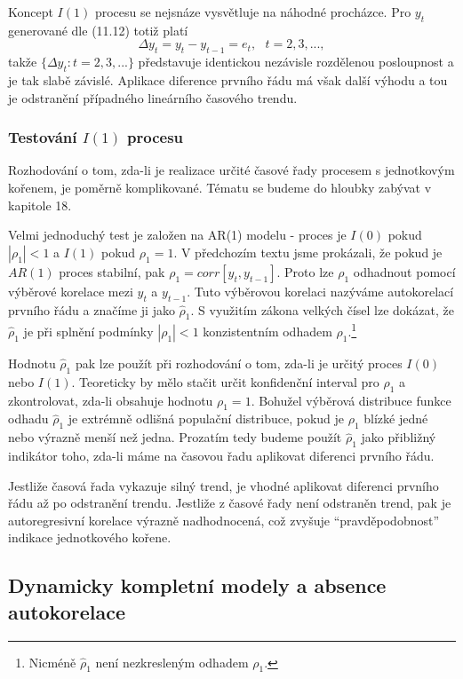 Koncept $I(1)$ procesu se nejsnáze vysvětluje na náhodné procházce. Pro $y_t$ generované dle (11.12) totiž platí
\begin{equation}
\Delta y_t = y_t -  y_{t - 1} = e_t, ~~~ t = 2, 3, ...,
\end{equation}
takže $\{\Delta y_t: t = 2, 3, ...\}$ představuje identickou nezávisle rozdělenou posloupnost a je tak slabě závislé. Aplikace diference prvního řádu má však další výhodu a tou je odstranění případného lineárního časového trendu.

\subsubsection{Testování $I(1)$ procesu}

Rozhodování o tom, zda-li je realizace určité časové řady procesem s jednotkovým kořenem, je poměrně komplikované. Tématu se budeme do hloubky zabývat v kapitole 18.

Velmi jednoduchý test je založen na AR(1) modelu - proces je $I(0)$ pokud $|\rho_1| < 1$ a $I(1)$ pokud $\rho_1 = 1$. V předchozím textu jsme prokázali, že pokud je $AR(1)$ proces stabilní, pak $\rho_1 = corr[y_t, y_{t - 1}]$. Proto lze $\rho_1$ odhadnout pomocí výběrové korelace mezi $y_t$ a $y_{t - 1}$. Tuto výběrovou korelaci nazýváme autokorelací prvního řádu a značíme ji jako $\hat{\rho}_1$. S využitím zákona velkých čísel lze dokázat, že $\hat{\rho}_1$ je při splnění podmínky $|\rho_1| < 1$ konzistentním odhadem $\rho_1$.\footnote{Nicméně $\hat{\rho}_1$ není nezkresleným odhadem $\rho_1$.}

Hodnotu $\hat{\rho}_1$ pak lze použít při rozhodování o tom, zda-li je určitý proces $I(0)$ nebo $I(1)$. Teoreticky by mělo stačit určit konfidenční interval pro $\rho_1$ a zkontrolovat, zda-li obsahuje hodnotu $\rho_1 = 1$. Bohužel výběrová distribuce funkce odhadu $\hat{\rho}_1$ je extrémně odlišná populační distribuce, pokud je $\rho_1$ blízké jedné nebo výrazně menší než jedna. Prozatím tedy budeme použít $\hat{\rho}_1$ jako přibližný indikátor toho, zda-li máme na časovou řadu aplikovat diferenci prvního řádu.

Jestliže časová řada vykazuje silný trend, je vhodné aplikovat diferenci prvního řádu až po odstranění trendu. Jestliže z časové řady není odstraněn trend, pak je autoregresivní korelace výrazně nadhodnocená, což zvyšuje ``pravděpodobnost'' indikace jednotkového kořene.  

\subsection{Dynamicky kompletní modely a absence autokorelace}

